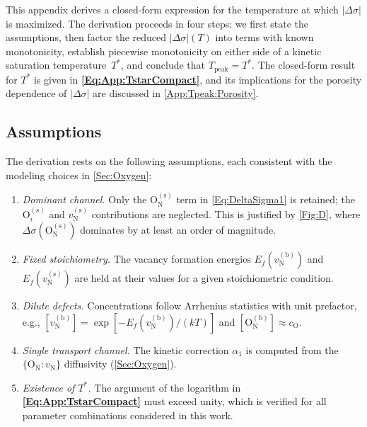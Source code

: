 \documentclass[preprint,12pt,sort&compress]{elsarticle}
\newcommand{\?}{\stackrel{?}{=}}
\providecommand{\DIFaddtex}[1]{{\bf #1}} %
\providecommand{\DIFdeltex}[1]{} %
\providecommand{\DIFaddbegin}{\protect\color{blue}} %
\providecommand{\DIFaddend}{\protect\color{black}} %
\providecommand{\DIFdelbegin}{\protect\color{red}} %
\providecommand{\DIFdelend}{\protect\color{black}} %
\providecommand{\DIFadd}[1]{\texorpdfstring{\DIFaddtex{#1}}{#1}} %
\providecommand{\DIFdel}[1]{\texorpdfstring{\DIFdeltex{#1}}{}} %
\begin{document}
This appendix derives a closed-form expression for the temperature at which $|\Delta \sigma|$ is maximized. The derivation proceeds in four steps: we first state the assumptions, then factor the reduced $|\Delta \sigma|(T)$ into terms with known monotonicity, establish piecewise monotonicity on either side of a kinetic saturation temperature~$T^*$, and conclude that $T_\text{peak} = T^*$. The closed-form result for $T^*$ is given in \DIFdelbegin \DIFdel{\cref{Eq:App:TstarFormula}}\DIFdelend \DIFaddbegin \DIFadd{\cref{Eq:App:TstarCompact}}\DIFaddend , and its implications for the \DIFdelbegin \DIFdel{weak }\DIFdelend porosity dependence of $|\Delta \sigma|$ are discussed in \ref{App:Tpeak:Porosity}.

\subsection{Assumptions}
\label{App:Tpeak:Assumptions}

The derivation rests on the following assumptions, each consistent with the modeling choices in \cref{Sec:Oxygen}:
\begin{enumerate}[label=(\roman*)]
    \item \textit{Dominant channel.} Only the $\text{O}_\text{N}^{(\text{s})}$ term in \cref{Eq:DeltaSigma1} is retained; the $\text{O}_i^{(\text{s})}$ and $v_\text{N}^{(\text{s})}$ contributions are neglected. This is justified by \cref{Fig:D}, where $\Delta \sigma(\text{O}_\text{N}^{(\text{s})})$ dominates by at least an order of magnitude.
    \item \textit{Fixed stoichiometry.} The vacancy formation energies $E_f(v_\text{N}^{(\text{b})})$ and $E_f(v_\text{N}^{(\text{s})})$ are held at their values for a given stoichiometric condition.
    \item \textit{Dilute defects.} Concentrations follow Arrhenius statistics with unit prefactor, e.g., $[v_\text{N}^{(\text{b})}] = \exp[-E_f(v_\text{N}^{(\text{b})})/(kT)]$ and $[\text{O}_\text{N}^{(\text{b})}] \approx c_\text{O}$.
    \item \textit{Single transport channel.} The kinetic correction $\alpha_1$ is computed from the $\{\text{O}_\text{N} : v_\text{N}\}$ diffusivity (\cref{Sec:Oxygen}).
    \item \textit{Existence of $T^*$.} The argument of the logarithm in \DIFdelbegin \DIFdel{\cref{Eq:App:TstarFormula} }\DIFdelend \DIFaddbegin \DIFadd{\cref{Eq:App:TstarCompact} }\DIFaddend must exceed unity, which is verified for all parameter combinations considered in this work.
\end{enumerate}
\end{document}
